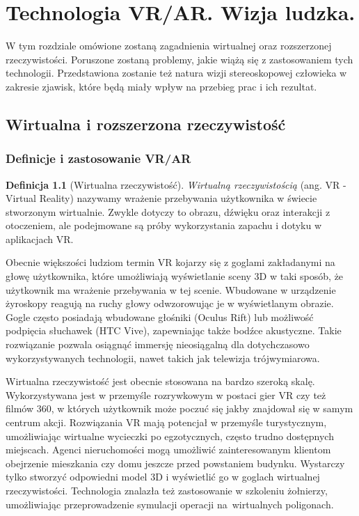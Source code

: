 \documentclass[a4paper,11pt,twoside]{report}
\theoremstyle{definition}
\newtheorem{definition}[theorem]{Definicja}
\begin{document}
\chapter{Technologia VR/AR. Wizja ludzka.}

W tym rozdziale omówione zostaną zagadnienia wirtualnej oraz rozszerzonej rzeczywistości. Poruszone zostaną problemy, jakie wiążą się z zastosowaniem tych technologii. Przedstawiona zostanie też natura wizji stereoskopowej człowieka w zakresie zjawisk, które będą miały wpływ na przebieg prac i ich rezultat.

\section{Wirtualna i rozszerzona rzeczywistość}

\subsection{Definicje i zastosowanie VR/AR}

\begin{definition}[Wirtualna rzeczywistość]
\textit{Wirtualną rzeczywistością} (ang. VR - Virtual Reality) nazywamy wrażenie przebywania użytkownika w świecie stworzonym wirtualnie. Zwykle dotyczy to obrazu, dźwięku oraz interakcji z otoczeniem, ale podejmowane są próby wykorzystania zapachu i dotyku w aplikacjach VR.
\end{definition}

Obecnie większości ludziom termin VR kojarzy się z goglami zakładanymi na głowę użytkownika, które umożliwiają wyświetlanie sceny 3D w taki sposób, że użytkownik ma wrażenie przebywania w tej scenie. Wbudowane w urządzenie żyroskopy reagują na ruchy głowy odwzorowując je w wyświetlanym obrazie. Gogle często posiadają wbudowane głośniki (Oculus Rift) lub możliwość podpięcia słuchawek (HTC Vive), zapewniając także bodźce akustyczne. Takie rozwiązanie pozwala osiągnąć immersję nieosiągalną dla dotychczasowo wykorzystywanych technologii, nawet takich jak telewizja trójwymiarowa.

Wirtualna rzeczywistość jest obecnie stosowana na bardzo szeroką skalę. Wykorzystywana jest w przemyśle rozrywkowym w postaci gier VR czy też filmów 360\textdegree, w których użytkownik może poczuć się jakby znajdował się w samym centrum akcji. Rozwiązania VR mają potencjał w przemyśle turystycznym, umożliwiając wirtualne wycieczki po egzotycznych, często trudno dostępnych miejscach. Agenci nieruchomości mogą umożliwić zainteresowanym klientom obejrzenie mieszkania czy domu jeszcze przed powstaniem budynku. Wystarczy tylko stworzyć odpowiedni model 3D i wyświetlić go w goglach wirtualnej rzeczywistości. Technologia znalazła też zastosowanie w szkoleniu żołnierzy, umożliwiając przeprowadzenie symulacji operacji na~wirtualnych poligonach.
\end{document}
